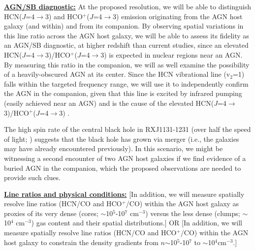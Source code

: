 \documentclass[12pt,a4paper]{article}
\newcommand{\rarr}{$\rightarrow$}
\newcommand{\dhcn}{HCN($J$=4\rarr3)\xspace}
\newcommand{\hcop}{HCO$^+$\xspace}
\newcommand{\dhcop}{HCO$^+$($J$=4\rarr3)\xspace}
\begin{document}
\underline{\bf AGN/SB diagnostic:}
At the proposed resolution, we will be able to distinguish \dhcn and \dhcop
emission originating from the AGN host galaxy (and within) and from its companion.
By observing spatial variations in this line ratio across the AGN host galaxy, 
we will be able to assess its fidelity as an AGN/SB diagnostic,
at higher redshift than current studies, since
an elevated \dhcn/\dhcop is expected in nuclear regions near an AGN. 
By measuring this ratio in the companion, we will as well 
examine the possibility of a heavily-obscured AGN at its center.
Since the HCN vibrational line (v$_2$=1) falls within the targeted frequency range, 
we will use it to independently confirm the AGN in the companion, given that this line is excited by infrared 
pumping (easily achieved near an AGN) and is the cause of the elevated \dhcn/\dhcop%
\citep{Sakamoto10a,Imanishi13a}.

The high spin rate of the central black hole in RXJ1131-1231 (over half the speed of light; \citealt{Reis14a})
suggests that the black hole has grown via merger (i.e., the 
galaxies may have already encountered previously).
In this scenario, we might be witnessing a
second encounter of two AGN host galaxies if 
we find evidence of a buried AGN in the companion, 
which the proposed observations are needed to provide such clues.

\underline{\bf Line ratios and physical conditions:}
[In addition, we will measure spatially resolve line ratios (HCN/CO and \hcop/CO) within the AGN host galaxy
as proxies of its very dense (cores; $\sim$10$^5$-10$^7$ cm$^{-3}$) versus the less dense (clumps; $\sim$10$^4$
cm$^{-3}$) gas content and their spatial distributions.]
OR 
[In addition, we will measure spatially resolve line ratios (HCN/CO and \hcop/CO) within the AGN host galaxy
to constrain the density gradients from $n$$\sim$10$^5$-10$^7$ 
to $\sim$10$^4$cm$^{-3}$.]
\end{document}
